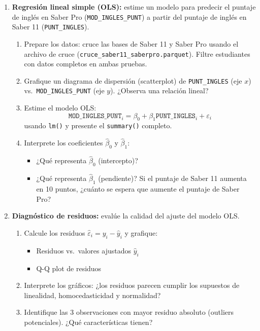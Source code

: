 \documentclass[11pt, a4paper]{article}
\begin{document}
\begin{enumerate}[label=\arabic*)]
  \item \textbf{Regresi\'on lineal simple (OLS):} estime un modelo para predecir
        el puntaje de ingl\'es en Saber Pro (\texttt{MOD\_INGLES\_PUNT}) a partir
        del puntaje de ingl\'es en Saber 11 (\texttt{PUNT\_INGLES}).
        \begin{enumerate}[label=\alph*)]
          \item Prepare los datos: cruce las bases de Saber 11 y Saber Pro
                usando el archivo de cruce (\texttt{cruce\_saber11\_saberpro.parquet}).
                Filtre estudiantes con datos completos en ambas pruebas.
          \item Grafique un diagrama de dispersi\'on (scatterplot) de
                \texttt{PUNT\_INGLES} (eje $x$) vs.\
                \texttt{MOD\_INGLES\_PUNT} (eje $y$). ¿Observa una relaci\'on
                lineal?
          \item Estime el modelo OLS:
                \[
                  \texttt{MOD\_INGLES\_PUNT}_i = \beta_0 + \beta_1
                  \texttt{PUNT\_INGLES}_i + \varepsilon_i
                \]
                usando \texttt{lm()} y presente el \texttt{summary()} completo.
          \item Interprete los coeficientes $\hat{\beta}_0$ y $\hat{\beta}_1$:
                \begin{itemize}
                  \item ¿Qu\'e representa $\hat{\beta}_0$ (intercepto)?
                  \item ¿Qu\'e representa $\hat{\beta}_1$ (pendiente)? Si el
                        puntaje de Saber 11 aumenta en 10 puntos, ¿cu\'anto
                        se espera que aumente el puntaje de Saber Pro?
                \end{itemize}
        \end{enumerate}

  \item \textbf{Diagn\'ostico de residuos:} eval\'ue la calidad del ajuste del
        modelo OLS.
        \begin{enumerate}[label=\alph*)]
          \item Calcule los residuos $\hat{\varepsilon}_i = y_i - \hat{y}_i$
                y grafique:
                \begin{itemize}
                  \item Residuos vs.\ valores ajustados $\hat{y}_i$
                  \item Q-Q plot de residuos
                \end{itemize}
          \item Interprete los gr\'aficos: ¿los residuos parecen cumplir los
                supuestos de linealidad, homocedasticidad y normalidad?
          \item Identifique las 3 observaciones con mayor residuo absoluto
                (outliers potenciales). ¿Qu\'e caracter\'isticas tienen?
        \end{enumerate}


\end{enumerate}
\end{document}
